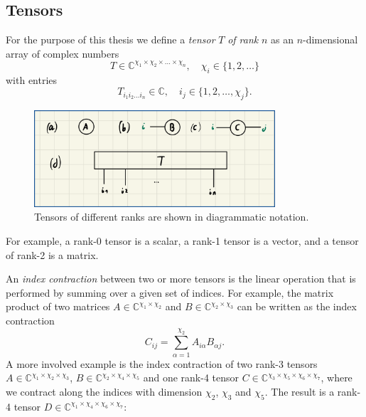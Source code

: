 \subsection*{Tensors}
For the purpose of this thesis we define a \textit{tensor} $T$ \textit{of rank} $n$ as an $n$-dimensional array of complex numbers
\begin{equation}
	T \in \mathbb{C}^{\chi_1\times\chi_2\times\dots\times\chi_n}, \quad \chi_i \in \{1, 2, \dots\}
\end{equation}
with entries
\begin{equation}
	T_{i_1i_2\dots i_n} \in \mathbb{C}, \quad i_j \in \{1, 2, \dots, \chi_j\}.
\end{equation}
\begin{figure}
	\centering
	\includegraphics[width=0.8\textwidth]{figures/Tensor_Networks/basic_tensor_diagrams.jpeg}
	\caption{Tensors of different ranks are shown in diagrammatic notation.}
	\label{fig:basic_tensor_diagrams}
\end{figure}
For example, a rank-0 tensor is a scalar, a rank-1 tensor is a vector, and a tensor of rank-2 is a matrix. \par
An \textit{index contraction} between two or more tensors is the linear operation that is performed by summing over a given set of indices. For example, the matrix product of two matrices $A \in \mathbb{C}^{\chi_1\times\chi_2}$ and $B \in \mathbb{C}^{\chi_2\times\chi_3}$ can be written as the index contraction
\begin{equation}
	\label{eq:example_tensor_network_matrix_product}
	C_{ij} = \sum_{\alpha=1}^{\chi_2} A_{i\alpha} B_{\alpha j}.
\end{equation}
A more involved example is the index contraction of two rank-3 tensors $A\in\mathbb{C}^{\chi_1\times\chi_2\times\chi_3}$, $B\in\mathbb{C}^{\chi_2\times\chi_4\times\chi_5}$ and one rank-4 tensor $C\in\mathbb{C}^{\chi_3\times\chi_5\times\chi_6\times\chi_7}$, where we contract along the indices with dimension $\chi_2$, $\chi_3$ and $\chi_5$. The result is a rank-4 tensor $D\in\mathbb{C}^{\chi_1\times\chi_4\times\chi_6\times\chi_7}$:
